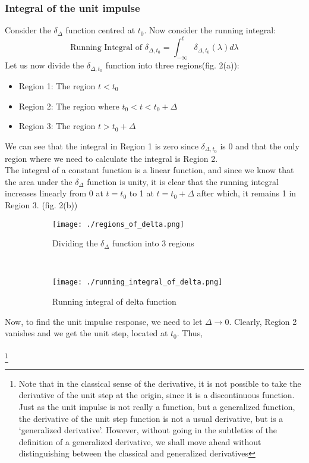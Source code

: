 \subsubsection{Integral of the unit impulse}
Consider the $\delta_\Delta$ function centred at $t_0$. Now consider the running integral:
$$\textrm{Running Integral of }\delta_{\Delta,t_0} = \int_{-\infty}^t \delta_{\Delta,t_0}(\lambda)d\lambda$$
\indent Let us now divide the $\delta_{\Delta,t_0}$ function into three regions(fig. 2(a)):
\begin{itemize}
\item Region 1: The region $t<t_0$
\item Region 2: The region where $t_0< t <t_0+\Delta$
\item Region 3: The region $t>t_0+\Delta$
\end{itemize}
\indent We can see that the integral in Region 1 is zero since $\delta_{\Delta,t_0}$ is $0$ and that the only region where we need to calculate the integral is Region 2.\\
\indent The integral of a constant function is a linear function, and since we know that the area under the $\delta_\Delta$ function is unity, it is clear that the running integral increases linearly from 0 at $t=t_0$ to 1 at $t=t_0+\Delta$ after which, it remains 1 in Region 3. (fig. 2(b))
\begin{figure}[H]
        \centering
        \begin{subfigure}[b]{0.5\textwidth}
                \texttt{[image: ./regions\_of\_delta.png]}
                \caption{Dividing the $\delta_\Delta$ function into 3 regions}
        \end{subfigure}
        \quad
	~	\quad
        \begin{subfigure}[b]{0.5\textwidth}
                \texttt{[image: ./running\_integral\_of\_delta.png]}
                \caption{Running integral of delta function}
        \end{subfigure}
        \caption{}
\end{figure}
\indent Now, to find the unit impulse response, we need to let $\Delta\rightarrow 0$. Clearly, Region 2 vanishes and we get the unit step, located at $t_0$.
Thus, 
\\\\
\noindent{}\footnote{Note that in the classical sense of the derivative, it is not possible to take the derivative of the unit step at the origin, since it is a discontinuous function. Just as the unit impulse is not really a function, but a generalized function, the derivative of the unit step function is not a usual derivative, but is a `generalized derivative'. However, without going in the subtleties of the definition of a generalized derivative, we shall move ahead without distinguishing between the classical and generalized derivatives}
 
